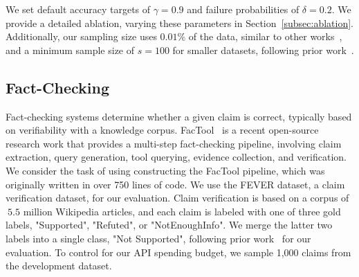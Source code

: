  We set default accuracy targets of $\gamma=0.9$ and failure probabilities of $\delta=0.2$. We provide a detailed ablation, varying these parameters in Section~\ref{subsec:ablation}. Additionally, our sampling size uses $0.01\%$ of the data, similar to other works~\cite{shankar_docetl_2024}, and a minimum sample size of $s=100$ for smaller datasets, following prior work~\cite{kang_approximate_2020}.


\subsection{Fact-Checking}
\label{subsec:factchecking}
Fact-checking systems determine whether a given claim is correct, typically based on verifiability with a knowledge corpus. 
FacTool~\cite{chern_factool_2023} is a recent open-source research work that provides a  multi-step fact-checking pipeline, involving claim extraction, query generation, tool querying, evidence collection, and verification. We consider the task of using constructing the FacTool pipeline, which was originally written in over 750 lines of code. We use the FEVER \cite{thorne_fever_2018} dataset, a claim verification dataset, for our evaluation. Claim verification is based on a corpus of $~5.5$ million Wikipedia articles, and each claim is labeled with one of three gold labels, "Supported", "Refuted", or "NotEnoughInfo". We merge the latter two labels into a single class, "Not Supported", following prior work~\cite{chern_factool_2023} for our evaluation. To control for our API spending budget, we sample 1,000 claims from the development dataset. 

